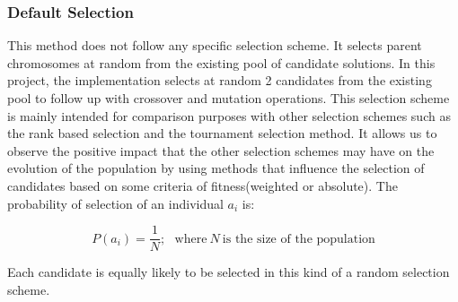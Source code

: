 \documentclass[a4paper, 12pt]{article}
\begin{document}
\subsubsection{Default Selection}
This method does not follow any specific selection scheme. It selects parent chromosomes at random from the existing pool of candidate solutions. In this project, the implementation selects at random 2 candidates from the existing pool to follow up with crossover and mutation operations. This selection scheme is mainly intended for comparison purposes with other selection schemes such as the rank based selection and the tournament selection method. It allows us to observe the positive impact that the other selection schemes may have on the evolution of the population by using methods that influence the selection of candidates based on some criteria of fitness(weighted or absolute).
The probability of selection of an individual $a_i$ is:
\begin{large}
\boldmath\begin{equation*}
P\left(a_{i}\right) = \frac{1}{N};\ \ \ \text{where}\ N\ \text{is the size of the population}
\end{equation*}
\end{large}
Each candidate is equally likely to be selected in this kind of a random selection scheme.
\end{document}
